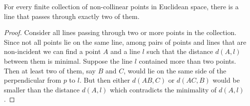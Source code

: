 \documentclass[12pt]{article}
\begin{document}
For every finite collection of non-collinear points in Euclidean space, there is a line that passes through exactly two of them.

\begin{proof}
Consider all lines passing through two or more points in the collection.
Since not all points lie on the same line, among pairs of points and lines that are non-incident we can find a point $A$ and a line $l$ such that the distance $d(A,l)$ between them is minimal. Suppose the line $l$ contained more than two points. Then at least two of them, say $B$ and $C$, would lie on the same side of the perpendicular from $p$ to $l$. But then either $d(AB,C)$ or $d(AC,B)$ would be smaller than the distance $d(A,l)$ which contradicts the minimality of $d(A,l)$.
\end{proof}
\end{document}
